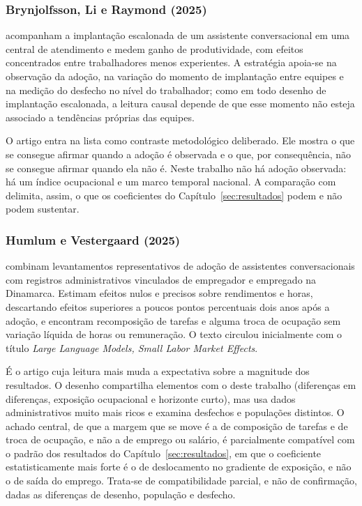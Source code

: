 \subsubsection{Brynjolfsson, Li e Raymond (2025)}

 acompanham a implantação escalonada de um
assistente conversacional em uma central de atendimento e medem ganho de
produtividade, com efeitos concentrados entre trabalhadores menos experientes.
A estratégia apoia-se na observação da adoção, na variação do momento de
implantação entre equipes e na medição do desfecho no nível do trabalhador;
como em todo desenho de implantação escalonada, a leitura causal depende de que
esse momento não esteja associado a tendências próprias das equipes.

O artigo entra na lista como contraste metodológico deliberado. Ele mostra o
que se consegue afirmar quando a adoção é observada e o que, por consequência,
não se consegue afirmar quando ela não é. Neste trabalho não há adoção
observada: há um índice ocupacional e um marco temporal nacional. A comparação com  delimita, assim, o que os
coeficientes do Capítulo~\ref{sec:resultados} podem e não podem sustentar.

\subsubsection{Humlum e Vestergaard (2025)}

 combinam levantamentos representativos de adoção de
assistentes conversacionais com registros administrativos vinculados de
empregador e empregado na Dinamarca. Estimam efeitos nulos e precisos sobre
rendimentos e horas, descartando efeitos superiores a poucos pontos percentuais
dois anos após a adoção, e encontram recomposição de tarefas e alguma troca de
ocupação sem variação líquida de horas ou remuneração. O texto circulou
inicialmente com o título \textit{Large Language Models, Small Labor Market
Effects}.

É o artigo cuja leitura mais muda a expectativa sobre a magnitude dos
resultados. O desenho compartilha elementos com o deste trabalho (diferenças em
diferenças, exposição ocupacional e horizonte curto), mas usa dados
administrativos muito mais ricos e examina desfechos e populações distintos. O
achado central, de que a margem que se move é a de composição de tarefas e de
troca de ocupação, e não a de emprego ou salário, é parcialmente compatível com
o padrão dos resultados do Capítulo~\ref{sec:resultados}, em que o coeficiente
estatisticamente mais forte é o de deslocamento no gradiente de exposição, e não
o de saída do emprego. Trata-se de compatibilidade parcial, e não de
confirmação, dadas as diferenças de desenho, população e desfecho.

